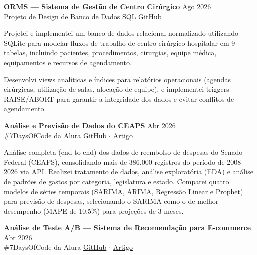 \justifying
\noindent
\textbf{ORMS — Sistema de Gestão de Centro Cirúrgico} \hfill Ago 2026 \\
Projeto de Design de Banco de Dados SQL \hfill \href{https://github.com/barlettab/harvard-cs50-sql}{GitHub}
\vspace{0.1em}
\begin{zitemize}
\setlength{\itemsep}{0.1em}
    \item Projetei e implementei um banco de dados relacional normalizado utilizando SQLite para modelar fluxos de trabalho de centro cirúrgico hospitalar em 9 tabelas, incluindo pacientes, procedimentos, cirurgias, equipe médica, equipamentos e recursos de agendamento.
    \item Desenvolvi views analíticas e índices para relatórios operacionais (agendas cirúrgicas, utilização de salas, alocação de equipe), e implementei triggers RAISE/ABORT para garantir a integridade dos dados e evitar conflitos de agendamento.
\end{zitemize}
\noindent
\textbf{Análise e Previsão de Dados do CEAPS} \hfill Abr 2026 \\
\#7DaysOfCode da Alura \hfill \href{https://github.com/barlettab/ceaps-data-analysis}{GitHub} $\cdot$ \href{https://medium.com/@barlettabc/o-que-os-dados-revelam-sobre-os-gastos-do-senado-642a91bdd0a4}{Artigo}
\vspace{0.1em}
\begin{zitemize}
\setlength{\itemsep}{0.1em}
    \item Análise completa (end-to-end) dos dados de reembolso de despesas do Senado Federal (CEAPS), consolidando mais de 386.000 registros do período de 2008–2026 via API. Realizei tratamento de dados, análise exploratória (EDA) e análise de padrões de gastos por categoria, legislatura e estado. Comparei quatro modelos de séries temporais (SARIMA, ARIMA, Regressão Linear e Prophet) para previsão de despesas, selecionando o SARIMA como o de melhor desempenho (MAPE de 10,5\%) para projeções de 3 meses.
\end{zitemize}
\vspace{0.2em}
\noindent
\textbf{Análise de Teste A/B — Sistema de Recomendação para E-commerce} \hfill Abr 2026 \\
\#7DaysOfCode da Alura \hfill \href{https://github.com/barlettab/ab-testing-ecommerce}{GitHub} $\cdot$ \href{https://medium.com/@barlettabc/i-tested-a-product-recommendation-system-the-result-was-no-and-thats-the-point-4449d76658a4}{Artigo}
\vspace{0.1em}
